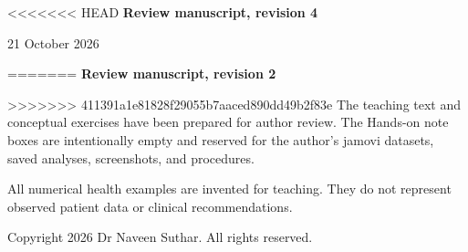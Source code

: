 \clearpage
\thispagestyle{empty}
\vspace*{3cm}
<<<<<<< HEAD
{\Large\bfseries Review manuscript, revision 4}\par
21 October 2026\par
=======
{\Large\bfseries Review manuscript, revision 2}\par
>>>>>>> 411391a1e81828f29055b7aaced890dd49b2f83e
\vspace{0.8cm}
The teaching text and conceptual exercises have been prepared for author review.
The Hands-on note boxes are intentionally empty and reserved for the author's
jamovi datasets, saved analyses, screenshots, and procedures.\par
\vspace{0.6cm}
All numerical health examples are invented for teaching. They do not represent
observed patient data or clinical recommendations.\par
\vspace{0.6cm}
Copyright \textcopyright{} 2026 Dr Naveen Suthar. All rights reserved.\par
\clearpage
